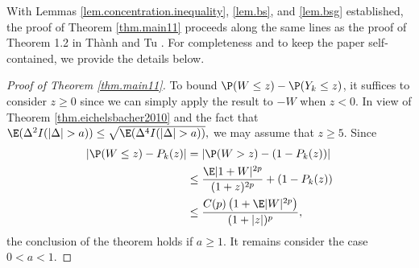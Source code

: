 With Lemmas \ref{lem.concentration.inequality}, \ref{lem.bs}, and \ref{lem.bsg} established, the proof of Theorem \ref{thm.main11} 
proceeds along the same lines as the proof of Theorem 1.2 in Th\`{a}nh and Tu \cite{thanh2025non}.  For completeness and to keep the paper self-contained, we provide the details below.
	
\begin{proof}[Proof of Theorem \ref{thm.main11}]
	To  bound $\P(W\le z) - \P(Y_k\le z)$, it suffices to consider $z \ge 0$ since we can simply apply the result to $-W$ when $z<0$. In view of  Theorem \ref{thm.eichelsbacher2010}
	and the fact that
	$\E(\Delta^2I(|\Delta|>a))\le \sqrt{\E(\Delta^4I(|\Delta|>a))},$
	we may assume that $z\ge 5$.
	Since
	\begin{equation*}
		\begin{split}
			|\P(W\le z) - P_k(z)|&=|\P(W> z) - (1-P_k(z))|\\
			&\le \dfrac{\E|1+W|^{2p}}{(1+z)^{2p}}+(1-P_k(z))\\
			&\le \dfrac{C(p)\left(1+\E|W|^{2p}\right)}{(1+|z|)^p},\\
		\end{split}
	\end{equation*}
	the conclusion of the theorem holds if $a\ge 1$. It remains consider the case $0<a<1$.
	

\end{proof}
